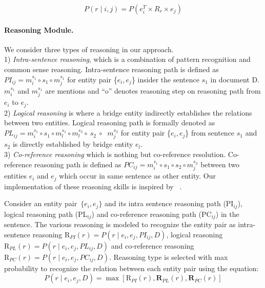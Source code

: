 \documentclass[letterpaper]{article} %
\begin{document}
\begin{equation}\label{eq8}
    P(r \mid i,j)=P(e_i^T \times R_r \times e_j)
\end{equation}


\paragraph{\textbf{Reasoning Module.}} We consider three types of reasoning in our approach. \\
  1) \textit{Intra-sentence reasoning}, which is a combination of pattern recognition and common sense reasoning.
  Intra-sentence reasoning path is defined as \( P I_{i j}=m_{i}^{s_{1}} \circ s_{1} \circ m_{j}^{s_{1}} \) for entity pair \{$e_i,e_j$\} insider the sentence $s_1$ in document D. $m_i^{s_1}$ and $m_j^{s_1}$ are mentions and \enquote{o} denotes reasoning step on reasoning path from $e_i$ to $e_j$.  \\
  2) \textit{Logical reasoning} is where a bridge entity indirectly establishes the relations between two entities.
  Logical reasoning path is formally denoted as \( P L_{i j}=m_{i}^{s_{1}} \circ s_{1} \circ m_{l}^{s_{1}} \circ m_{l}^{s_{2}} \circ \ s_{2}\  \circ \)  \(\  m_{j}^{s_{2}} \) for entity pair \{$e_i,e_j$\} from sentence $s_1$ and $s_2$ is directly established by bridge entity $e_l$.   \\
  3) \textit{Co-reference reasoning} which is nothing but co-reference resolution. %
  Co-reference reasoning path is defined as \( PC_{ij}=m_{i}^{s_{1}} \circ s_{1} \circ s_{2} \circ m_{j}^{s_{2}} \) between two entities $e_i$ and $e_j$ which occur in same sentence as other entity. Our implementation of these reasoning skills is inspired by ~\cite{xu-etal-2021-discriminative}.

Consider an entity pair~$\{e_i,e_j\}$ and its intra sentence reasoning path (PI$_{i j}$), logical reasoning path (PL$_{i j}$) and co-reference reasoning path (PC$_{i j}$) in the sentence. The various reasoning is modeled to recognize the entity pair as intra-sentence reasoning \( \mathrm{R}_{P I}(r)=P\left(r \mid e_{i}, e_{j}, P I_{i j}, D\right) \), logical reasoning \( \mathrm{R}_{P L}(r)=P\left(r \mid e_{i}, e_{j}, P L_{i j}, D\right) \)
 and co-reference reasoning \( \mathrm{R}_{P C}(r)=P\left(r \mid e_{i}, e_{j}, P C_{i j}, D\right) \).
 Reasoning type is selected with max probability to recognize the relation between each entity pair using the equation:
 \begin{equation}
     P\left(r \mid e_{i}, e_{j}, D\right)=\max \left[\mathrm{R}_{P I}(r), \mathbf{R}_{P L}(r), \mathbf{R}_{P C}(r)\right]
 \end{equation}
\end{document}
